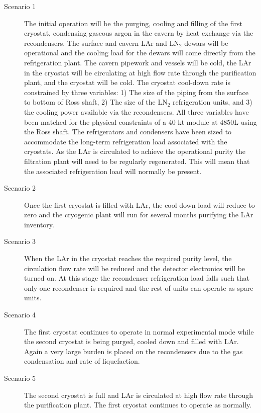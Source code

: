 \begin{description}
\item[Scenario 1]
The initial operation will be the purging, cooling and filling of the 
first cryostat, condensing gaseous argon in the cavern by heat exchange 
via the recondensers. The surface and cavern LAr and  LN$_2$ dewars 
will be operational and the cooling load for the dewars will come 
directly from the refrigeration plant. The cavern pipework and vessels 
will be cold, the LAr in the cryostat will be circulating at high flow 
rate through the purification plant, and the cryostat will be cold.
The cryostat cool-down rate is constrained by three variables: 1) The 
size of the piping from the surface to bottom of Ross shaft, 2) The 
size of the LN$_2$ refrigeration units, and 3) the cooling power 
available via the recondensers.  All three variables have been 
matched for the physical constraints of a 40 kt module at 4850L 
using the Ross shaft. The refrigerators and condensers have been 
sized to accommodate the long-term refrigeration load associated 
with the cryostats.  As the LAr is circulated to achieve the 
operational purity the filtration plant will need to be regularly 
regenerated. This will mean that the associated refrigeration 
load will normally be present.

\item[Scenario 2]
Once the first cryostat is filled with LAr, the cool-down load will 
reduce to zero and the cryogenic plant will run for several months 
purifying the LAr inventory.

\item[Scenario 3]
When the LAr in the cryostat reaches the required purity level, the 
circulation flow rate will be reduced and the detector electronics 
will be turned on.  At this stage the recondenser refrigeration 
load falls such that only one recondenser is required and the 
rest of units can operate as spare units.

\item[Scenario 4] The first cryostat continues to operate in normal
experimental mode 
while  the second cryostat is being purged, cooled down and 
filled with LAr. Again a very large burden is placed on the 
recondensers due to the gas condensation and rate of liquefaction.

\item[Scenario 5] The second cryostat is full and LAr is circulated 
at high flow rate through the purification plant. The first cryostat
continues to operate as normally.


\end{description}
